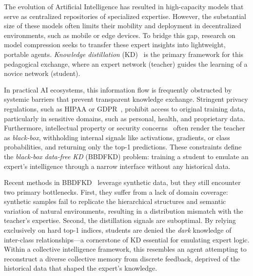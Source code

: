 \begin{foldable} %
  The evolution of Artificial Intelligence has resulted in high-capacity models that serve as centralized repositories of specialized expertise.
  However, the substantial size of these models often limits their mobility and deployment in decentralized environments, such as mobile or edge devices.
  To bridge this gap, research on model compression seeks to transfer these expert insights into lightweight, portable agents.
  \textit{Knowledge distillation} (KD)~\cite{hinton2015distilling} is the primary framework for this pedagogical exchange, where an expert network (teacher) guides the learning of a novice network (student).
\end{foldable}

\begin{foldable} %
  In practical AI ecosystems, this information flow is frequently obstructed by systemic barriers that prevent transparent knowledge exchange.
  Stringent privacy regulations, such as HIPAA or GDPR~\cite{us1996hipaa, eu2016gdpr}, prohibit access to original training data, particularly in sensitive domains, such as personal, health, and proprietary data.
  Furthermore, intellectual property or security concerns~\cite{us2016dsta} often render the teacher as \textit{black-box}, withholding internal signals like activations, gradients, or class probabilities, and returning only the top-1 predictions.
  These constraints define the \textit{black-box data-free KD} (BBDFKD) problem: training a student to emulate an expert's intelligence through a narrow interface without any historical data.
\end{foldable}

\begin{foldable} %
  Recent methods in BBDFKD~\cite{wang2021zero,zhang2022ideal,yuan2024data} leverage synthetic data, but they still encounter two primary bottlenecks.
  First, they suffer from a lack of domain coverage: synthetic samples fail to replicate the hierarchical structures and semantic variation of natural environments, resulting in a distribution mismatch with the teacher's expertise.
  Second, the distillation signals are suboptimal.
  By relying exclusively on hard top-1 indices, students are denied the \textit{dark} knowledge of inter-class relationships---a cornerstone of KD essential for emulating expert logic.
  Within a collective intelligence framework, this resembles an agent attempting to reconstruct a diverse collective memory from discrete feedback, deprived of the historical data that shaped the expert's knowledge.
\end{foldable}


